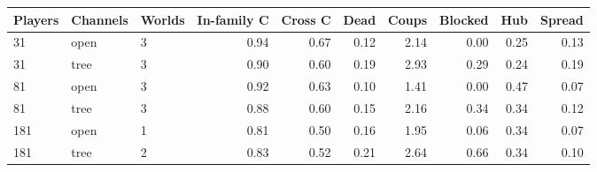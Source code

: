 \begin{tabular}{@{}lllrrrrrrr@{}}
\toprule
Players & Channels & Worlds & In-family C & Cross C & Dead & Coups & Blocked & Hub & Spread \\
\midrule
31 & open & 3 & 0.94 & 0.67 & 0.12 & 2.14 & 0.00 & 0.25 & 0.13 \\
31 & tree & 3 & 0.90 & 0.60 & 0.19 & 2.93 & 0.29 & 0.24 & 0.19 \\
81 & open & 3 & 0.92 & 0.63 & 0.10 & 1.41 & 0.00 & 0.47 & 0.07 \\
81 & tree & 3 & 0.88 & 0.60 & 0.15 & 2.16 & 0.34 & 0.34 & 0.12 \\
181 & open & 1 & 0.81 & 0.50 & 0.16 & 1.95 & 0.06 & 0.34 & 0.07 \\
181 & tree & 2 & 0.83 & 0.52 & 0.21 & 2.64 & 0.66 & 0.34 & 0.10 \\
\bottomrule
\end{tabular}
